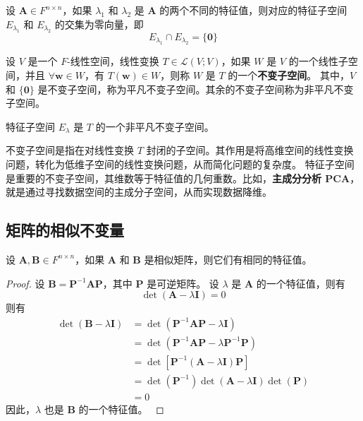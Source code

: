 \begin{corollary}[不同特征值的特征子空间的交集为零向量]
    设 $\mathbf{A}\in F^{n\times n}$，如果 $\lambda_1$ 和 $\lambda_2$ 是 $\mathbf{A}$ 的两个不同的特征值，则对应的特征子空间 $E_{\lambda_1}$ 和 $E_{\lambda_2}$ 的交集为零向量，即
    \[
        E_{\lambda_1} \cap E_{\lambda_2} = \{\mathbf{0}\}
    \]
\end{corollary}
\vspace{1em}

\begin{definition}
    设 $V$ 是一个 $F$-线性空间，线性变换 $T\in \mathcal{L}(V;V)$，如果 $W$ 是 $V$ 的一个线性子空间，并且 $\forall \mathbf{w}\in W$，有 $T(\mathbf{w})\in W$，则称 $W$ 是 $T$ 的一个\textbf{不变子空间}。
    其中，$V$ 和 $\{\mathbf{0}\}$ 是不变子空间，称为平凡不变子空间。其余的不变子空间称为非平凡不变子空间。
    \label{def:invariant_subspace}
\end{definition}

\begin{proposition}
    特征子空间 $E_\lambda$ 是 $T$ 的一个非平凡不变子空间。
\end{proposition}

\begin{note}
    不变子空间是指在对线性变换 $T$ 封闭的子空间。其作用是将高维空间的线性变换问题，转化为低维子空间的线性变换问题，从而简化问题的复杂度。
    特征子空间是重要的不变子空间，其维数等于特征值的几何重数。比如，\textbf{主成分分析 PCA}，就是通过寻找数据空间的主成分子空间，从而实现数据降维。
\end{note}

\vspace{1em}
\subsection{矩阵的相似不变量}

\begin{proposition}[相似矩阵有相同的特征值]
    设 $\mathbf{A},\mathbf{B}\in F^{n\times n}$，如果 $\mathbf{A}$ 和 $\mathbf{B}$ 是相似矩阵，则它们有相同的特征值。
\end{proposition}

\begin{proof}
    设 $\mathbf{B} = \mathbf{P}^{-1}\mathbf{A}\mathbf{P}$，其中 $\mathbf{P}$ 是可逆矩阵。
    设 $\lambda$ 是 $\mathbf{A}$ 的一个特征值，则有
    \[
        \det(\mathbf{A} - \lambda \mathbf{I}) = 0
    \]
    则有
    \begin{align*}
        \det(\mathbf{B} - \lambda \mathbf{I}) &= \det(\mathbf{P}^{-1}\mathbf{A}\mathbf{P} - \lambda \mathbf{I})\\
        &= \det(\mathbf{P}^{-1}\mathbf{A}\mathbf{P} - \lambda \mathbf{P}^{-1}\mathbf{P})\\
        &= \det[\mathbf{P}^{-1}(\mathbf{A} - \lambda \mathbf{I})\mathbf{P}]\\
        &= \det(\mathbf{P}^{-1})\det(\mathbf{A} - \lambda \mathbf{I})\det(\mathbf{P})\\
        &= 0
    \end{align*}
    因此，$\lambda$ 也是 $\mathbf{B}$ 的一个特征值。
    \label{prop:similar_matrices_have_same_eigenvalues}
\end{proof}

